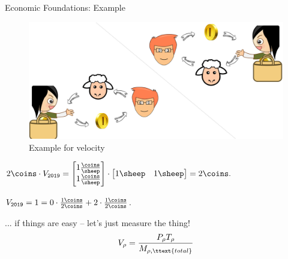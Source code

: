 \documentclass[]{beamer}
\begin{document}

\begin{frame}{Economic Foundations: Example}


  \begin{figure}
    \centerline{\includegraphics[scale=0.08]{./pics/used/sheep_example_HR}}
    \caption{Example for velocity}
    \label{fig:vola_example}
  \end{figure}

  $ \displaystyle
  \begin{aligned}%
    2 \coins \cdot V_{\mathtt{2019}} = %
    \begin{bmatrix}%
      1 \frac{\coins}{\sheep} \\%
      1 \frac{\coins}{\sheep}%
    \end{bmatrix} \cdot \begin{bmatrix}%
      1 \sheep & 1 \sheep%
    \end{bmatrix} = 2 \coins.%
  \end{aligned} %
  $ %

  $V_{\mathtt{2019}}= 1 = 0 \cdot \frac{%
    1\coins%
  }{%
    2\coins%
  } + 2 \cdot \frac{%
    1\coins%
  }{%
    2\coins%
  }$. %

  
\end{frame}



\begin{frame}{... if things are easy -- let's just measure the thing!}
  \begin{align*}
    V_{\rho} = \frac{P_{\rho}T_{\rho}}{M_{\rho, \ttext{total}}}  
  \end{align*}

\end{frame}

\end{document}
